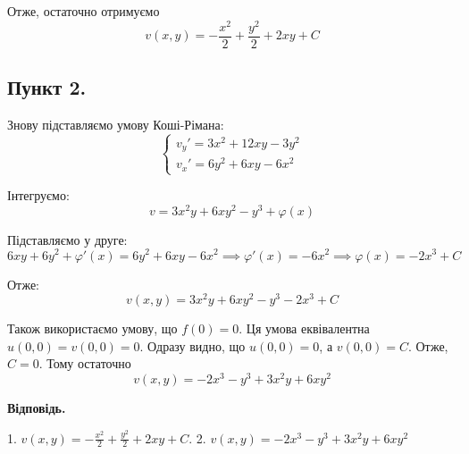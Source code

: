 \documentclass[14pt]{extarticle}
\begin{document}
Отже, остаточно отримуємо
\[
v(x,y) = -\frac{x^2}{2} + \frac{y^2}{2} + 2xy + C
\]

\subsection*{Пункт 2.} 

Знову підставляємо умову Коші-Рімана:
\[
\begin{cases}
    v_y' = 3x^2+12xy-3y^2 \\
    v_x' = 6y^2+6xy-6x^2 
\end{cases}
\]

Інтегруємо:
\[
v = 3x^2y + 6xy^2 - y^3 + \varphi(x)
\]

Підставляємо у друге:
\[
6xy + 6y^2 + \varphi'(x) = 6y^2 + 6xy - 6x^2 \implies \varphi'(x) = -6x^2 \implies \varphi(x) = -2x^3 + C
\]

Отже:
\[
v(x,y) = 3x^2y + 6xy^2 - y^3 - 2x^3 + C
\]

Також використаємо умову, що $f(0)=0$. Ця умова еквівалентна $u(0,0)=v(0,0)=0$. Одразу видно, що $u(0,0)=0$, а $v(0,0)=C$. Отже, $C=0$. Тому остаточно
\[
v(x,y) = -2x^3-y^3+3x^2y+6xy^2
\]

\textbf{Відповідь.} 

1. $v(x,y)=-\frac{x^2}{2}+\frac{y^2}{2}+2xy+C$. 
2. $v(x,y)=-2x^3-y^3+3x^2y+6xy^2$
\end{document}
